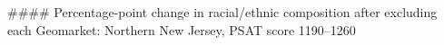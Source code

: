 #### Percentage-point change in racial/ethnic composition after excluding each Geomarket: Northern New Jersey, PSAT score 1190–1260
